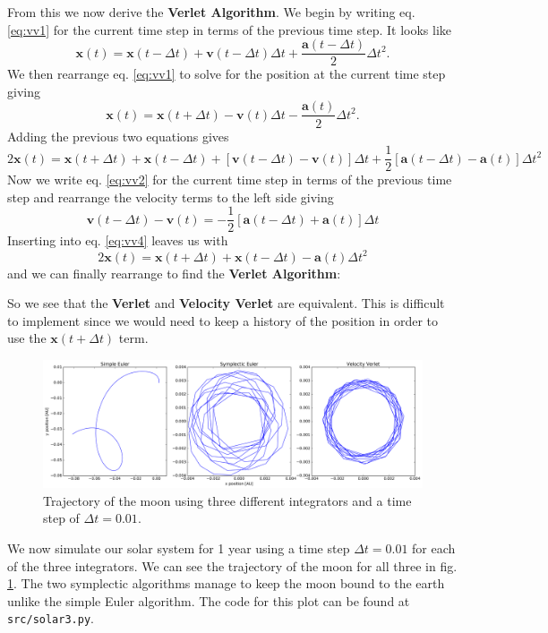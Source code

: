 \documentclass[a4paper,11pt,bibtotoc]{scrartcl}
\newcommand*\widefbox[1]{\fbox{\hspace{2em}#1\hspace{2em}}}
\begin{document}
From this we now derive the \textbf{Verlet Algorithm}. We begin by writing eq. \ref{eq:vv1} for the current time step in terms of the previous time step. It looks like
\begin{equation}
\bm{x}(t) = \bm{x}(t - \Delta t) + \bm{v}(t - \Delta t)\Delta t + \frac{\bm{a}(t - \Delta t)}{2}\Delta t^2 \label{eq:vv3}.
\end{equation}
We then rearrange eq. \ref{eq:vv1} to solve for the position at the current time step giving
\begin{equation}
\bm{x}(t) = \bm{x}(t + \Delta t) - \bm{v}(t)\Delta t - \frac{\bm{a}(t)}{2}\Delta t^2.
\end{equation}
Adding the previous two equations gives
\begin{equation}
2\bm{x}(t) = \bm{x}(t + \Delta t) + \bm{x}(t - \Delta t) +\left[\bm{v}(t - \Delta t) -\bm{v}(t)\right]\Delta t + \frac{1}{2} \left[\bm{a}(t -\Delta t) - \bm{a}(t)\right]\Delta t^2\label{eq:vv4}
\end{equation}
Now we write eq. \ref{eq:vv2} for the current time step in terms of the previous time step and rearrange the velocity terms to the left side giving
\begin{equation}
\bm{v}(t - \Delta t) -\bm{v}(t) = -\frac{1}{2}\left[\bm{a}(t-\Delta t) +\bm{a}(t)\right] \Delta t
\end{equation}
Inserting into eq. \ref{eq:vv4} leaves us with
\begin{equation}
2\bm{x}(t) = \bm{x}(t + \Delta t)+\bm{x}(t - \Delta t) - \bm{a}(t)\Delta t^2
\end{equation}
and we can finally rearrange to find the \textbf{Verlet Algorithm}:
So we see that the \textbf{Verlet} and \textbf{Velocity Verlet} are equivalent. This is difficult to implement since we would need to keep a history of the position in order to use the $\bm{x}(t+\Delta t)$ term.

\begin{figure}
	\includegraphics[width=1.0\linewidth]{../fig/solar3.png}
	\centering
	\caption{Trajectory of the moon using three different integrators and a time step of $\Delta t = 0.01$.}
	\label{fig:solar3}
\end{figure}
We now simulate our solar system for 1 year using a time step $\Delta t = 0.01$ for each of the three integrators. We can see the trajectory of the moon for all three in fig. \ref{fig:solar3}. The two symplectic algorithms manage to keep the moon bound to the earth unlike the simple Euler algorithm. The code for this plot can be found at \texttt{src/solar3.py}.
\end{document}
